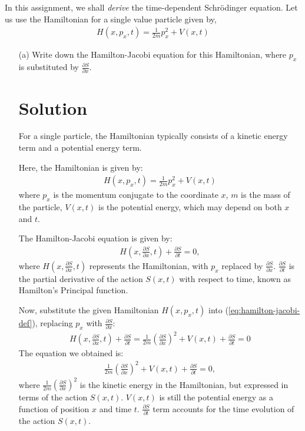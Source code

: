 In this assignment, we shall \textit{derive} the time-dependent Schrödinger equation. 
\bigskip\bigskip\hline\hline\bigskip
Let us use the Hamiltonian for a single value particle given by,
\begin{align*}
    H(x, p_x, t) = \frac{1}{2m} p_x^2 + V(x, t)
\end{align*}
\begin{enumerate}
    \item[(a)] Write down the Hamilton-Jacobi equation for this Hamiltonian, where $p_x$ is substituted by $\displaystyle\frac{\partial S}{\partial x}$.
    \bigskip\bigskip\hline\hline\bigskip
    \section*{Solution}
    For a single particle, the Hamiltonian typically consists of a kinetic energy term and a potential energy term.
    
    Here, the Hamiltonian is given by:
    \begin{align}
        H(x, p_x, t) = \frac{1}{2m} p_x^2 + V(x, t)
    \end{align}
    where $p_x$ is the momentum conjugate to the coordinate $x$, $m$ is the mass of the particle, $V(x, t)$ is the potential energy, which may depend on both $x$ and $t$.

    The Hamilton-Jacobi equation is given by:    
    \begin{align}
        H\left(x, \frac{\partial S}{\partial x}, t\right) + \frac{\partial S}{\partial t} = 0,\label{eq:hamilton-jacobi-def}
    \end{align}
    where $\displaystyle H\left(x, \frac{\partial S}{\partial x}, t\right)$ represents the Hamiltonian, with $p_x$ replaced by $\displaystyle\frac{\partial S}{\partial x}$. $\displaystyle\frac{\partial S}{\partial t}$ is the partial derivative of the action $S(x, t)$ with respect to time, known as Hamilton's Principal function.
    
    Now, substitute the given Hamiltonian $H(x, p_x, t)$ into (\ref{eq:hamilton-jacobi-def}), replacing $p_x$ with $\displaystyle\frac{\partial S}{\partial x}$:
    \begin{align}
        H\left(x, \frac{\partial S}{\partial x}, t\right) + \frac{\partial S}{\partial t} = \frac{1}{2m} \left(\frac{\partial S}{\partial x}\right)^2 + V(x, t) + \frac{\partial S}{\partial t} = 0
    \end{align}
    The equation we obtained is:
    \begin{align}
        \frac{1}{2m} \left(\frac{\partial S}{\partial x}\right)^2 + V(x, t) + \frac{\partial S}{\partial t} = 0,
    \end{align}
    where $\displaystyle\frac{1}{2m} \left(\frac{\partial S}{\partial x}\right)^2$ is the kinetic energy in the Hamiltonian, but expressed in terms of the action $S(x, t)$. $V(x, t)$ is still the potential energy as a function of position $x$ and time $t$. $\displaystyle\frac{\partial S}{\partial t}$ term accounts for the time evolution of the action $S(x, t)$.
    

\end{enumerate}
